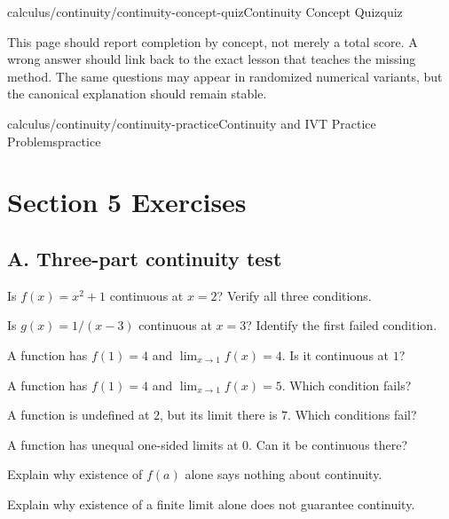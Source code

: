 \begin{webpage}{calculus/continuity/continuity-concept-quiz}{Continuity Concept Quiz}{quiz}
\begin{bgsummary}[title={Quiz use on the website}]
This page should report completion by concept, not merely a total score. A wrong answer should link back to the exact lesson that teaches the missing method. The same questions may appear in randomized numerical variants, but the canonical explanation should remain stable.
\end{bgsummary}
\end{webpage}

\begin{webpage}{calculus/continuity/continuity-practice}{Continuity and IVT Practice Problems}{practice}
\section*{Section 5 Exercises}

\subsection*{A. Three-part continuity test}
\begin{bgexercises}[label=\textbf{5.\arabic*}]
  \item Is \(f(x)=x^2+1\) continuous at \(x=2\)? Verify all three conditions.
  \item Is \(g(x)=1/(x-3)\) continuous at \(x=3\)? Identify the first failed condition.
  \item A function has \(f(1)=4\) and \(\lim_{x\to1}f(x)=4\). Is it continuous at \(1\)?
  \item A function has \(f(1)=4\) and \(\lim_{x\to1}f(x)=5\). Which condition fails?
  \item A function is undefined at \(2\), but its limit there is \(7\). Which conditions fail?
  \item A function has unequal one-sided limits at \(0\). Can it be continuous there?
  \item Explain why existence of \(f(a)\) alone says nothing about continuity.
  \item Explain why existence of a finite limit alone does not guarantee continuity.
\end{bgexercises}


\end{webpage}
